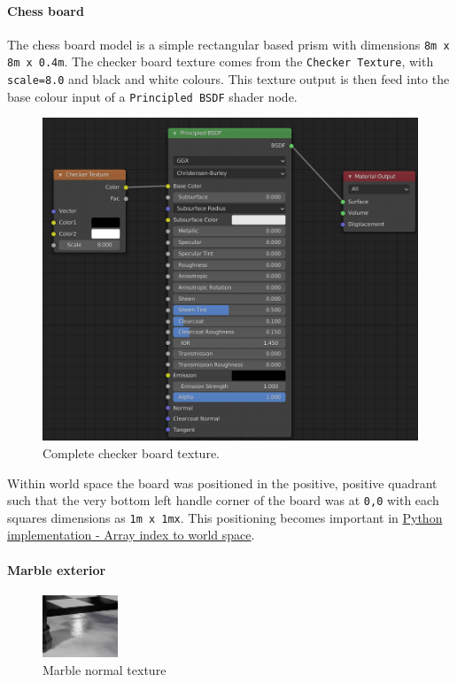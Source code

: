 \documentclass[11pt]{article}
\begin{document}
\paragraph{Chess board}
\label{sec:org60ed7f9}
The chess board model is a simple rectangular based prism with dimensions \texttt{8m x
8m x 0.4m}. The checker board texture comes from the \texttt{Checker Texture}, with
\texttt{scale=8.0} and black and white colours. This texture output is then feed into
the base colour input of a \texttt{Principled BSDF} shader node.\\

\begin{figure}[htbp]
\centering
\includegraphics[width=350pt]{Images/checker texture.png}
\caption{\label{checker-texture}Complete checker board texture.}
\end{figure}

Within world space the board was positioned in the positive, positive quadrant
such that the very bottom left handle corner of the board was at \texttt{0,0}
with each squares dimensions as \texttt{1m x 1mx}. This positioning becomes important
in \hyperref[sec:org67aeaaf]{Python implementation - Array index to world space}.
\paragraph{Marble exterior}
\label{sec:org93c1dfc}
\begin{figure}
\centering
\includegraphics[width=0.2\textwidth]{Images/normal.png}
\caption{\label{marble-normal-texture}Marble normal texture}
\end{figure}
\end{document}
